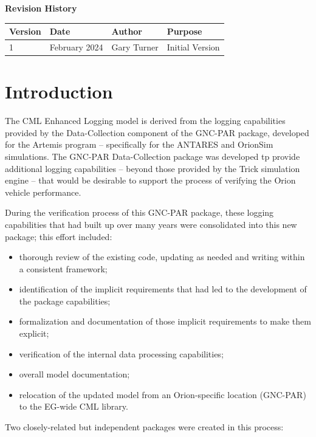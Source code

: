 \documentclass[11pt,fleqn]{report}
\begin{document}
\titlePage
\clearpage %
\tableofcontents %
\vfill
{\Large \textbf {Revision History}}
{\large
\begin{center}
\begin{tabular}{|l||l|l|l|}
\hline
 \textbf{Version} & \textbf{Date} & \textbf{Author} & \textbf{Purpose} \\ \hline
 \hline
1 & February 2024 & Gary Turner & Initial Version \\ \hline
\end{tabular}
\end{center}
}

\chapter{Introduction} %
The CML Enhanced Logging model is derived from the logging capabilities
provided by the Data-Collection component of the GNC-PAR package, developed for
the Artemis program -- specifically for the ANTARES and OrionSim simulations.
The GNC-PAR Data-Collection package was developed tp provide additional
logging capabilities -- beyond those provided by the Trick simulation engine
-- that would be desirable to support the process of verifying the Orion
vehicle performance.

During the verification process of this GNC-PAR package, these logging
capabilities that had built up over many years were consolidated into this
new package; this effort included:

\begin{itemize}
  \item thorough review of the existing code, updating as needed and
        writing within a consistent framework;
  \item identification of the implicit requirements that had led to the
        development of the package capabilities;
  \item formalization and documentation of those implicit requirements to
        make them explicit;
  \item verification of the internal data processing capabilities;
  \item overall model documentation;
  \item relocation of the updated model from an Orion-specific location
        (GNC-PAR) to the EG-wide CML library.
\end{itemize}
Two closely-related but independent packages were created in this process:
\end{document}
